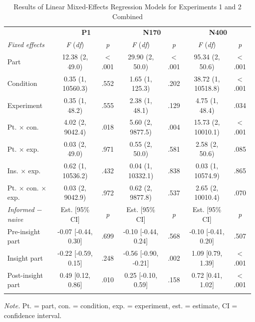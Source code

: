 \documentclass[
  english,
  man,floatsintext]{apa7}
\begin{document}
\begin{table}[tbp]

\begin{center}
\begin{threeparttable}

\caption{\label{tab:joint-table}Results of Linear Mixed-Effects Regression Models for Experiments 1 and 2 Combined\smallskip}

\footnotesize{

\begin{tabular}{lcccccc}
\toprule
 & \multicolumn{2}{c}{\textbf{P1}} & \multicolumn{2}{c}{\textbf{N170}} & \multicolumn{2}{c}{\textbf{N400}} \\
\cmidrule(r){2-3} \cmidrule(r){4-5} \cmidrule(r){6-7}
\textit{Fixed effects} & \textit{F} (\textit{df}) & \textit{p} & \textit{F} (\textit{df}) & \textit{p} & \textit{F} (\textit{df}) & \textit{p}\\
\midrule
Part & 12.38 (2, 49.0) & < .001 & 29.90 (2, 50.0) & < .001 & 95.34 (2, 50.6) & < .001\\
Condition & 0.35 (1, 10560.3) & .552 & 1.65 (1, 125.3) & .202 & 38.72 (1, 10518.8) & < .001\\
Experiment & 0.35 (1, 48.2) & .555 & 2.38 (1, 48.1) & .129 & 4.75 (1, 48.4) & .034\\
Pt. × con. & 4.02 (2, 9042.4) & .018 & 5.60 (2, 9877.5) & .004 & 15.73 (2, 10010.1) & < .001\\
Pt. × exp. & 0.03 (2, 49.0) & .971 & 0.55 (2, 50.0) & .581 & 2.58 (2, 50.6) & .085\\
Ins. × exp. & 0.62 (1, 10536.2) & .432 & 0.04 (1, 10332.1) & .838 & 0.03 (1, 10574.9) & .865\\
Pt. × con. × exp. & 0.03 (2, 9042.9) & .972 & 0.62 (2, 9877.8) & .537 & 2.65 (2, 10010.4) & .070\\
\textit{Informed $-$  naive} & Est. [95\% CI] & \textit{p} & Est. [95\% CI] & \textit{p} & Est. [95\% CI] & \textit{p}\\ \midrule
Pre-insight part & -0.07 [-0.44, 0.30] & .699 & -0.10 [-0.44, 0.24] & .568 & -0.10 [-0.41, 0.20] & .507\\
Insight part & -0.22 [-0.59, 0.15] & .248 & -0.56 [-0.90, -0.21] & .002 & 1.09 [0.79, 1.39] & < .001\\
Post-insight part & 0.49 [0.12, 0.86] & .010 & 0.25 [-0.10, 0.59] & .158 & 0.72 [0.41, 1.02] & < .001\\
\bottomrule
\addlinespace
\end{tabular}

}

\begin{tablenotes}[para]
\normalsize{\textit{Note.} Pt. = part, con. = condition, exp. = experiment, est. = estimate, CI = confidence interval.}
\end{tablenotes}

\end{threeparttable}
\end{center}

\end{table}
\end{document}
